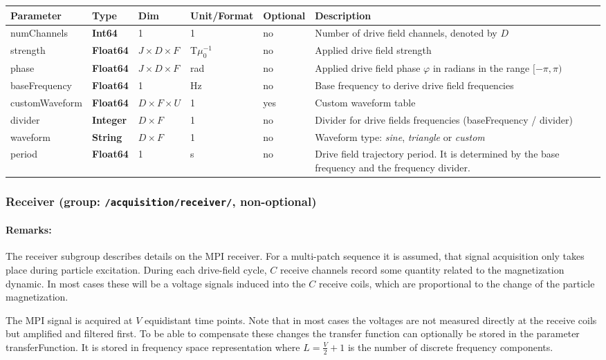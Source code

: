 \documentclass[landscape,a4paper]{article} %
\newcommand{\inl}[1]{\lstinline[columns=fixed]{#1}}
\newcommand{\inltab}[1]{{\ttfamily\bfseries\color{blue}#1}}
\newcommand{\inlvar}[1]{{\ttfamily#1}}
\begin{document}
\noindent \begin{tabularx}{\columnwidth}{lllllX} 
\textbf{Parameter} & \textbf{Type} & \textbf{Dim} & \textbf{Unit/Format} & \textbf{Optional} & \textbf{Description} \\ \hline 
\inlvar{numChannels} & \inltab{Int64} & 1 & 1 & no & Number of drive field channels, denoted by $D$ \\ \hline
\inlvar{strength} & \inltab{Float64} & $J \times D \times F $ & T$\mu_0^{-1}$ & no & Applied drive field strength \\ \hline
\inlvar{phase} & \inltab{Float64} & $J \times D \times F$ & rad & no & Applied drive field phase $\varphi$ in radians in the range $[-\pi,\pi)$ \\ \hline
\inlvar{baseFrequency} & \inltab{Float64} & 1 & Hz & no & Base frequency to derive drive field frequencies \\ \hline
\inlvar{customWaveform} & \inltab{Float64} & $D \times F \times U$ & 1 & yes & Custom waveform table \\ \hline
\inlvar{divider} & \inltab{Integer} & $D \times F$ & 1 & no & Divider for drive fields frequencies (\inlvar{baseFrequency} / \inlvar{divider}) \\ \hline
\inlvar{waveform} & \inltab{String} & $D \times F$ & 1 & no & Waveform type: \textit{sine}, \textit{triangle} or \textit{custom} \\ \hline
\inlvar{period} & \inltab{Float64} & 1 & s & no & Drive field trajectory period. It is determined by the base frequency and the frequency divider.\\ \hline
\end{tabularx}


\subsubsection{Receiver (group: \inl{/acquisition/receiver/}, non-optional)}

\begin{multicols}{2}
\paragraph{Remarks:} The receiver subgroup describes details on the MPI receiver. For a multi-patch sequence it is assumed, that signal acquisition only takes place during particle excitation. During each drive-field cycle, $C$ receive channels record some quantity related to the magnetization dynamic. In most cases these will be a voltage signals induced into the $C$ receive coils, which are proportional to the change of the particle magnetization. 

The MPI signal is acquired at $V$ equidistant time points. Note that in most cases the voltages are not measured directly at the receive coils but amplified and filtered first. To be able to compensate these changes the transfer function can optionally be stored in the parameter \inlvar{transferFunction}. It is stored in frequency space representation where $L=\frac{V}{2}+1$ is the number of discrete frequency components.
\end{multicols}
\end{document}
